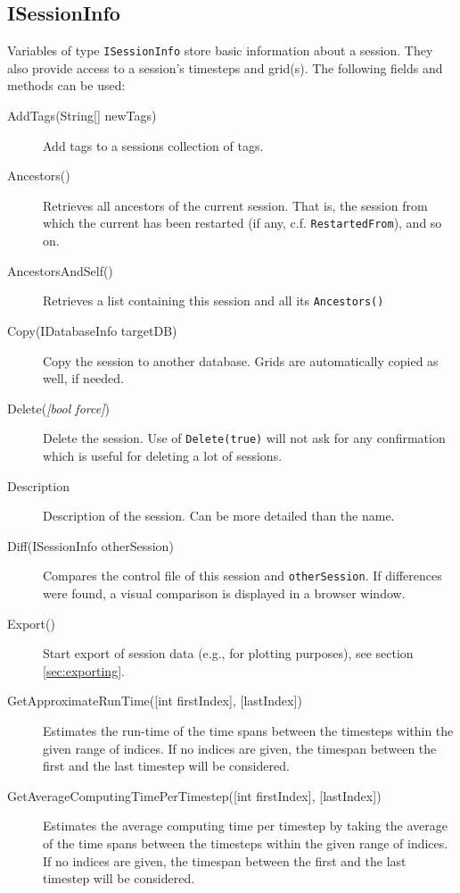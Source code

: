 \subsection{ISessionInfo}
Variables of type \lstinline{ISessionInfo} store basic information about a session. They also provide access to a session's timesteps and grid(s).
The following fields and methods can be used:
\begin{description}
	\item[AddTags(String{[}{]} newTags)]
	Add tags to a sessions collection of tags.
	
	\item[Ancestors()]
	Retrieves all ancestors of the current session. That is, the session from which the current has been restarted (if any, c.f. \lstinline{RestartedFrom}), and so on.
	
	\item[AncestorsAndSelf()]
	Retrieves a list containing this session and all its \lstinline{Ancestors()}
	
	\item[Copy(IDatabaseInfo targetDB)]
	Copy the session to another database. Grids are automatically copied as well, if needed.
	
	\item[Delete(\emph{{[}bool force{]}})]
	Delete the session. Use of \lstinline{Delete(true)} will not ask for any confirmation which is useful for deleting a lot of sessions.
	
	\item[Description]
	Description of the session. Can be more detailed than the name.
	
	\item[Diff(ISessionInfo otherSession)]
	Compares the control file of this session and \lstinline{otherSession}. If differences were found, a visual comparison is displayed in a browser window.
	
	\item[Export()]
	Start export of session data (e.g., for plotting purposes), see section \ref{sec:exporting}.
	
	\item[GetApproximateRunTime({[}int firstIndex{]}, {[}lastIndex{]})]
	Estimates the run-time of the time spans between the timesteps within the given range of indices. If no indices are given, the timespan between the first and the last timestep will be considered.
	
	\item[GetAverageComputingTimePerTimestep({[}int firstIndex{]}, {[}lastIndex{]})]
	Estimates the average computing time per timestep by taking the average of the time spans between the timesteps within the given range of indices. If no indices are given, the timespan between the first and the last timestep will be considered.
	

\end{description}
